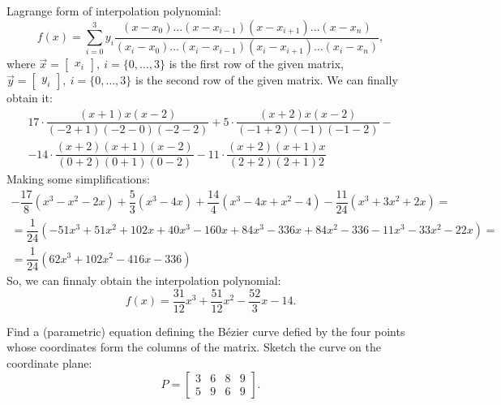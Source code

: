 \documentclass[12pt]{report}
\begin{document}
\begin{solution}
    Lagrange form of interpolation polynomial:
    \[
    f(x) = \sum\limits_{i=0}^{3}y_i \dfrac{(x-x_0)\ldots(x-x_{i-1})(x-x_{i+1})\ldots (x-x_n)}{(x_i - x_0)\ldots (x_i - x_{i-1})(x_i - x_{i+1})\ldots (x_i - x_n)},  
\]
where $\vec{x} = \begin{bmatrix}
   x_i
\end{bmatrix}, \ i = \{0, \ldots, 3\}$ is the first row of the given matrix, $\vec{y} = \begin{bmatrix}
   y_i
\end{bmatrix}, \ i = \{0, \ldots, 3\}$ is the second row of the given matrix. We can finally obtain it:
\[
   \begin{array}{c}
      \displaystyle 17 \cdot \dfrac{(x+1) x (x-2)}{(-2 + 1) (-2 - 0) (-2 - 2)} + 5 \cdot \dfrac{(x+2) x (x-2)}{(-1 + 2) (-1) (-1 - 2)} - \\[0.5cm]
      \displaystyle - 14\cdot \dfrac{(x+2) (x+1) (x-2)}{(0 + 2)(0 + 1) (0 - 2)} - 11 \cdot \dfrac{(x+2) (x+1) x}{(2 + 2) (2 + 1) 2}       
   \end{array}
\]
Making some simplifications:
\[
   \begin{array}{c}
      \displaystyle -\dfrac{17}{8}\left(x^3 - x^2 - 2x\right) + \dfrac{5}{3} \left(x^3 - 4x\right) + \dfrac{14}{4} \left(x^3 - 4x + x^2 -4\right) - \dfrac{11}{24} \left(x^3 + 3x^2 + 2x\right) = \\ 
      \displaystyle = \dfrac{1}{24}\left(-51x^3 + 51x^2 + 102x + 40x^3 - 160x + 84x^3 -336x + 84x^2 -336 - 11x^3 - 33x^2 - 22x\right) = \\
      \displaystyle = \dfrac{1}{24}\left(62x^3 + 102x^2 - 416x - 336\right)
   \end{array}
\]
So, we can finnaly obtain the interpolation polynomial:
\[
   f(x) = \dfrac{31}{12}x^3 + \dfrac{51}{12}x^2 - \dfrac{52}{3}x - 14.
\]
\end{solution}

\begin{problem}{}
    Find a (parametric) equation defining the Bézier curve defied by the four points whose coordinates form the columns of the matrix. Sketch the curve on the coordinate plane:
    \[
         P = \begin{bmatrix}
            3 & 6 & 8 & 9\\
            5 & 9 & 6 & 9
         \end{bmatrix}.
    \]
\end{problem}
\end{document}
